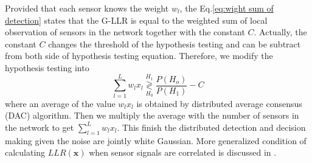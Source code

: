 Provided that each sensor knows the weight $w_{l}$, the Eq.\ref{eq:wight sum of detection}
states that the G-LLR is equal to the weighted sum of local observation
of sensors in the network together with the constant $C$. Actually,
the constant $C$ changes the threshold of the hypothesis testing
and can be subtract from both side of hypothesis testing equation.
Therefore, we modify the hypothesis testing into 
\[
\sum_{l=1}^{L}w_{l}x_{l}\underset{H_{0}}{\overset{H_{1}}{\gtrless}}\frac{P\left(H_{o}\right)}{P\left(H_{1}\right)}-C
\]
where an average of the value $w_{l}x_{l}$ is obtained by distributed
average consensus (DAC) algorithm. Then we multiply the average with
the number of sensors in the network to get $\sum_{l=1}^{L}w_{l}x_{l}$.
This finish the distributed detection and decision making given the
noise are jointly white Gaussian. More generalized condition of calculating
$LLR(\mathbf{x})$ when sensor signals are correlated is discussed
in . 
